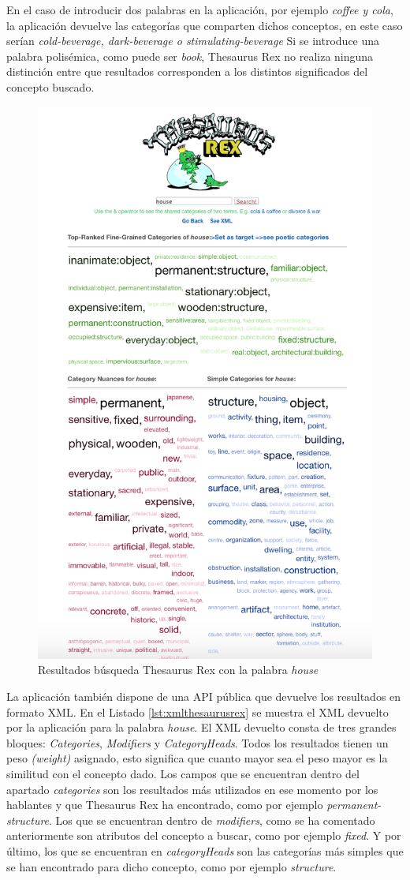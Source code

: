En el caso de introducir dos palabras en la aplicación, por ejemplo \textit{coffee y cola}, la aplicación devuelve las categorías que comparten dichos conceptos, en este caso serían \textit{cold-beverage, dark-beverage o stimulating-beverage} Si se introduce una palabra polisémica, como puede ser \textit{book}, Thesaurus Rex no realiza ninguna distinción entre que resultados corresponden a los distintos significados del concepto buscado.
\begin{figure}[!h]
	\includegraphics[width=.6\textwidth]{Imagenes/Bitmap/Capitulo2/thesaurusrex.png}
	\centering
	\caption{Resultados búsqueda Thesaurus Rex con la palabra \textit{house}}
	\label{fig:thesaurusrex}
\end{figure}

La aplicación también dispone de una API pública que devuelve los resultados en formato XML.
En el Listado \ref{lst:xmlthesaurusrex} se muestra el XML devuelto por la aplicación para la palabra \textit{house}. El XML devuelto consta de tres grandes bloques: \textit{Categories}, \textit{Modifiers} y \textit{CategoryHeads}. Todos los resultados tienen un peso \textit{(weight)} asignado, esto significa que cuanto mayor sea el peso mayor es la similitud con el concepto dado. 
Los campos que se encuentran dentro del apartado \textit{categories} son los resultados más utilizados en ese momento por los hablantes y que Thesaurus Rex ha encontrado, como por ejemplo \textit{permanent-structure}. Los que se encuentran dentro de  \textit{modifiers}, como se ha comentado anteriormente son atributos del concepto a buscar, como por ejemplo \textit{fixed}. Y por último, los que se encuentran en \textit{categoryHeads} son las categorías más simples que se han encontrado para dicho concepto, como por ejemplo \textit{structure}.

